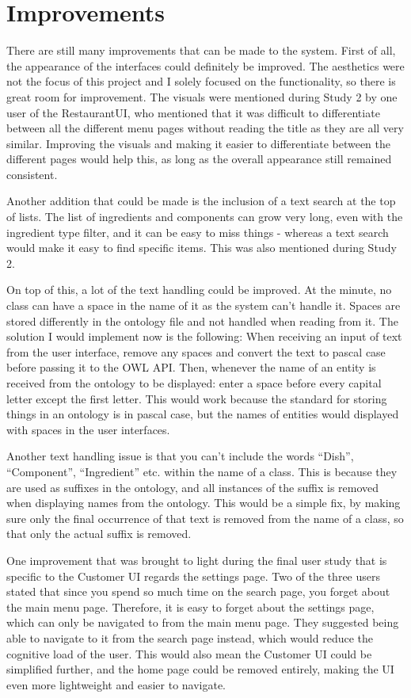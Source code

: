 \section{Improvements}

There are still many improvements that can be made to the system. First of all, the appearance of the interfaces could definitely be improved. The aesthetics were not the focus of this project and I solely focused on the functionality, so there is great room for improvement. The visuals were mentioned during Study 2 by one user of the RestaurantUI, who mentioned that it was difficult to differentiate between all the different menu pages without reading the title as they are all very similar. Improving the visuals and making it easier to differentiate between the different pages would help this, as long as the overall appearance still remained consistent.

Another addition that could be made is the inclusion of a text search at the top of lists. The list of ingredients and components can grow very long, even with the ingredient type filter, and it can be easy to miss things - whereas a text search would make it easy to find specific items. This was also mentioned during Study 2.

On top of this, a lot of the text handling could be improved. At the minute, no class can have a space in the name of it as the system can't handle it. Spaces are stored differently in the ontology file and not handled when reading from it. The solution I would implement now is the following: When receiving an input of text from the user interface, remove any spaces and convert the text to pascal case before passing it to the OWL API. Then, whenever the name of an entity is received from the ontology to be displayed: enter a space before every capital letter except the first letter. This would work because the standard for storing things in an ontology is in pascal case, but the names of entities would displayed with spaces in the user interfaces.

Another text handling issue is that you can't include the words ``Dish'', ``Component'', ``Ingredient'' etc. within the name of a class. This is because they are used as suffixes in the ontology, and all instances of the suffix is removed when displaying names from the ontology. This would be a simple fix, by making sure only the final occurrence of that text is removed from the name of a class, so that only the actual suffix is removed.

One improvement that was brought to light during the final user study that is specific to the Customer UI regards the settings page. Two of the three users stated that since you spend so much time on the search page, you forget about the main menu page. Therefore, it is easy to forget about the settings page, which can only be navigated to from the main menu page. They suggested being able to navigate to it from the search page instead, which would reduce the cognitive load of the user. This would also mean the Customer UI could be simplified further, and the home page could be removed entirely, making the UI even more lightweight and easier to navigate.

